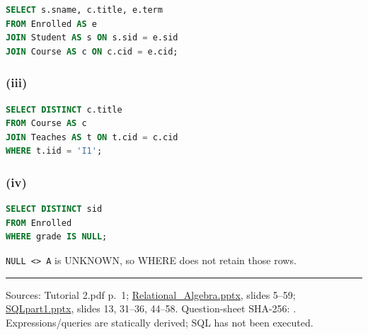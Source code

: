 \Needspace{90pt}
\begin{lstlisting}[language=SQL]
SELECT s.sname, c.title, e.term
FROM Enrolled AS e
JOIN Student AS s ON s.sid = e.sid
JOIN Course AS c ON c.cid = e.cid;
\end{lstlisting}

\subsubsection{(iii)}\label{tutorial2_answers-iii-1}

\Needspace{90pt}
\begin{lstlisting}[language=SQL]
SELECT DISTINCT c.title
FROM Course AS c
JOIN Teaches AS t ON t.cid = c.cid
WHERE t.iid = 'I1';
\end{lstlisting}

\subsubsection{(iv)}\label{tutorial2_answers-iv-1}

\Needspace{75pt}
\begin{lstlisting}[language=SQL]
SELECT DISTINCT sid
FROM Enrolled
WHERE grade IS NULL;
\end{lstlisting}

\texttt{NULL\ \textless{}\textgreater{}\ \textquotesingle{}A\textquotesingle{}} is UNKNOWN, so WHERE does not retain those rows.

\begin{center}\rule{0.5\linewidth}{0.5pt}\end{center}

Sources: Tutorial 2.pdf p.~1; \href{../../../slides/Relational_Algebra.pptx}{Relational\_Algebra.pptx}, slides 5--59; \href{../../../slides/SQLpart1.pptx}{SQLpart1.pptx}, slides 13, 31--36, 44--58. Question-sheet SHA-256: \texttt{}. Expressions/queries are statically derived; SQL has not been executed.
